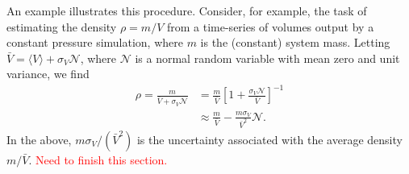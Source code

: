 An example illustrates this procedure.  Consider, for example, the task of estimating the density $\rho=m/V$ from a time-series of volumes output by a constant pressure simulation, where $m$ is the (constant) system mass.  Letting $\bar V = \langle V \rangle + \sigma_V \mathcal N$, where $\mathcal N$ is a normal random variable with mean zero and unit variance, we find
\begin{align}
\rho = \frac{m}{\bar V + \sigma_V \mathcal N} &= \frac{m}{\bar V}\left[1 + \frac{\sigma_V \mathcal N}{\bar V} \right]^{-1} \nonumber \\
& \approx \frac{m}{\bar V} - \frac{m \sigma_V }{\bar V^2} \mathcal N.
\end{align}
In the above, $m \sigma_V/(\bar V^2)$ is the uncertainty associated with the average density $m/\bar V$.  \textcolor{red}{Need to finish this section.}





%
%

